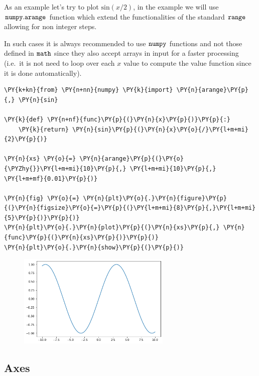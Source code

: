 As an example let's try to plot \(\mathrm{sin}(x/2)\), in the example we
will use \(\tt{numpy.arange}\) function which extend the functionalities
of the standard \(\tt{range}\) allowing for non integer steps.

In such cases it is always recommended to use \(\tt{numpy}\) functions
and not those defined in \(\tt{math}\) since they also accept arrays in
input for a faster processing (i.e.~it is not need to loop over each
\(x\) value to compute the value function since it is done
automatically).

\begin{tcolorbox}[breakable, size=fbox, boxrule=1pt, pad at break*=1mm,colback=cellbackground, colframe=cellborder]
\begin{Verbatim}[commandchars=\\\{\}]
\PY{k+kn}{from} \PY{n+nn}{numpy} \PY{k}{import} \PY{n}{arange}\PY{p}{,} \PY{n}{sin}
	
\PY{k}{def} \PY{n+nf}{func}\PY{p}{(}\PY{n}{x}\PY{p}{)}\PY{p}{:}
    \PY{k}{return} \PY{n}{sin}\PY{p}{(}\PY{n}{x}\PY{o}{/}\PY{l+m+mi}{2}\PY{p}{)}
	
\PY{n}{xs} \PY{o}{=} \PY{n}{arange}\PY{p}{(}\PY{o}{\PYZhy{}}\PY{l+m+mi}{10}\PY{p}{,} \PY{l+m+mi}{10}\PY{p}{,} \PY{l+m+mf}{0.01}\PY{p}{)}
	
\PY{n}{fig} \PY{o}{=} \PY{n}{plt}\PY{o}{.}\PY{n}{figure}\PY{p}{(}\PY{n}{figsize}\PY{o}{=}\PY{p}{(}\PY{l+m+mi}{8}\PY{p}{,}\PY{l+m+mi}{5}\PY{p}{)}\PY{p}{)}
\PY{n}{plt}\PY{o}{.}\PY{n}{plot}\PY{p}{(}\PY{n}{xs}\PY{p}{,} \PY{n}{func}\PY{p}{(}\PY{n}{xs}\PY{p}{)}\PY{p}{)}
\PY{n}{plt}\PY{o}{.}\PY{n}{show}\PY{p}{(}\PY{p}{)}
\end{Verbatim}
\end{tcolorbox}

\begin{figure}[h]
	\centering
	\includegraphics[width=0.65\textwidth]{figures/matplotlib_17_0.png}
\end{figure}

\subsection{Axes}\label{axes}

